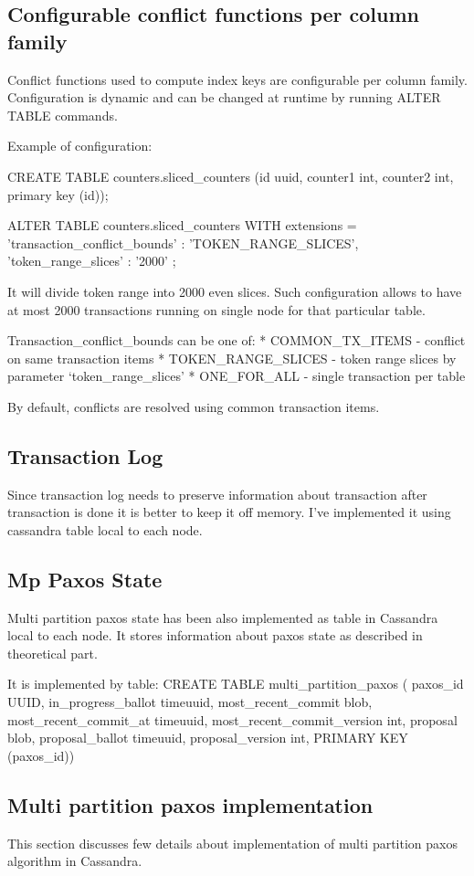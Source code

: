 \subsection{Configurable conflict functions per column family}
Conflict functions used to compute index keys are configurable per column family. Configuration is dynamic and can be changed at runtime by running ALTER TABLE commands.


Example of configuration:


CREATE TABLE counters.sliced_counters (id uuid, counter1 int, counter2 int, primary key (id));


ALTER TABLE counters.sliced_counters WITH extensions = { 'transaction_conflict_bounds' : 'TOKEN_RANGE_SLICES', 'token_range_slices' : '2000' };


It will divide token range into 2000 even slices. Such configuration allows to have at most 2000 transactions running on single node for that particular table.


Transaction_conflict_bounds can be one of:
* COMMON_TX_ITEMS - conflict on same transaction items
* TOKEN_RANGE_SLICES - token range slices by parameter ‘token_range_slices’
* ONE_FOR_ALL - single transaction per table


By default, conflicts are resolved using common transaction items.


\subsection{Transaction Log}
Since transaction log needs to preserve information about transaction after transaction is done it is better to keep it off memory. I’ve implemented it using cassandra table local to each node. 


\subsection{Mp Paxos State}
Multi partition paxos state has been also implemented as table in Cassandra local to each node. It stores information about paxos state as described in theoretical part.


It is implemented by table:
CREATE TABLE multi_partition_paxos (
paxos_id UUID,
in_progress_ballot timeuuid,
most_recent_commit blob,
most_recent_commit_at timeuuid,
most_recent_commit_version int,
proposal blob,
proposal_ballot timeuuid,
proposal_version int,
PRIMARY KEY (paxos_id))




\subsection{Multi partition paxos implementation}
This section discusses few details about implementation of multi partition paxos algorithm in Cassandra.


